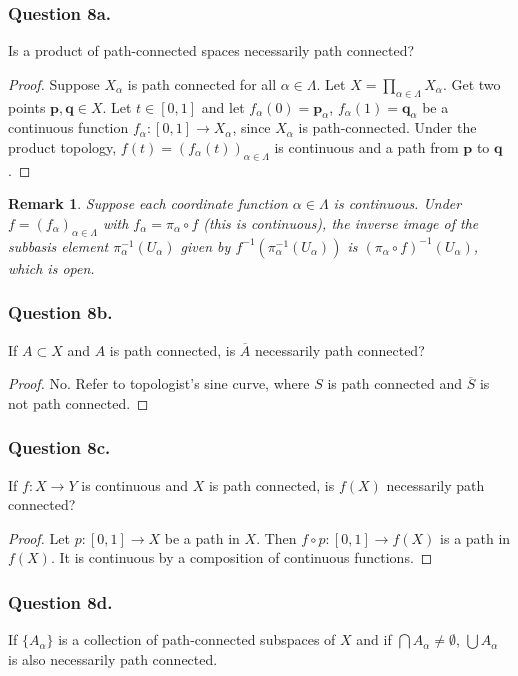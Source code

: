 \documentclass[12pt]{article}
\newtheorem{remark}{Remark}
\begin{document}
\subsubsection*{Question 8a.} 
Is a product of path-connected spaces necessarily path connected?
\begin{proof}
    Suppose $X_\alpha$ is path connected for all $\alpha \in \Lambda$.
Let $X = \prod_{\alpha \in \Lambda} X_\alpha$. Get two points $\mathbf{p}, \mathbf{q} \in X$. 
Let $t \in [0, 1]$
and let $f_\alpha(0) = \mathbf{p}_\alpha$, $f_\alpha(1) = \mathbf{q}_\alpha$ be a 
continuous function $f_\alpha: [0, 1] \rightarrow X_\alpha$, since $X_\alpha$
is path-connected. Under the product topology, $f(t) = (f_\alpha(t))_{\alpha \in \Lambda}$
is continuous and a path from $\mathbf{p}$ to $\mathbf{q}$.
\end{proof}

\begin{remark}
    Suppose each coordinate function $\alpha \in \Lambda$
    is continuous. Under $f = (f_\alpha)_{\alpha \in \Lambda}$
    with $f_\alpha = \pi_\alpha \circ f$ (this is continuous), the inverse image of the subbasis element
    $\pi_\alpha^{-1}(U_\alpha)$ given by $f^{-1}(\pi_\alpha^{-1}(U_\alpha))$ is 
    $(\pi_\alpha \circ f)^{-1}(U_\alpha)$, which is open.
\end{remark}

\subsubsection*{Question 8b.}
If $A \subset X$ and $A$ is path connected, is $\overline{A}$ necessarily 
path connected?
\begin{proof}
    No. Refer to topologist's sine curve, where $S$ is path connected and $\overline{S}$
    is not path connected.
\end{proof}

\subsubsection*{Question 8c.}
If $f : X \rightarrow Y$ is continuous and $X$ is
path connected, is $f(X)$ necessarily
path connected?
\begin{proof}
    Let $p: [0, 1] \rightarrow X$ be a path in $X$.
    Then $f \circ p: [0, 1] \rightarrow f(X)$ is a path in $f(X)$.
    It is continuous by a composition of continuous functions.
\end{proof}

\subsubsection*{Question 8d.}
If $\{A_{\alpha}\}$ is a collection of path-connected
subspaces of $X$ and if $\bigcap A_{\alpha} \neq \emptyset$, 
$\bigcup A_{\alpha}$ is also necessarily path connected.
\end{document}
